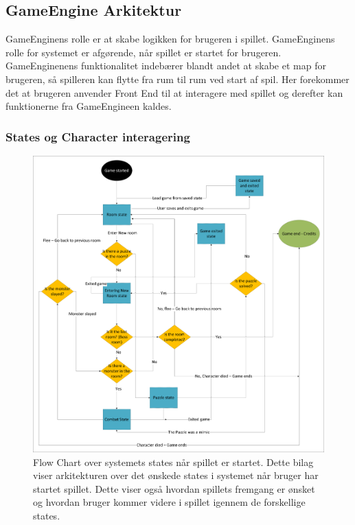 \subsection{GameEngine Arkitektur}
GameEnginens rolle er at skabe logikken for brugeren i spillet. GameEnginens rolle for systemet er afgørende, når spillet er startet for brugeren. GameEnginenens funktionalitet indebærer blandt andet at skabe et map for brugeren, så spilleren kan flytte fra rum til rum ved start af spil. Her forekommer det at brugeren anvender Front End til at interagere med spillet og derefter kan funktionerne fra GameEngineen kaldes.
\subsubsection{States og Character interagering}
\begin{figure}[H]
\centering
\includegraphics[width = \textwidth]{02-Body/Images/Arkitektur - State Logic.pdf}
\caption{Flow Chart over systemets states når spillet er startet. Dette bilag viser arkitekturen over det ønskede states i systemet når bruger har startet spillet. Dette viser også hvordan spillets fremgang er ønsket og hvordan bruger kommer videre i spillet igennem de forskellige states.}
\label{fig:Arkitektur-SD-SaveGame}
\end{figure}

